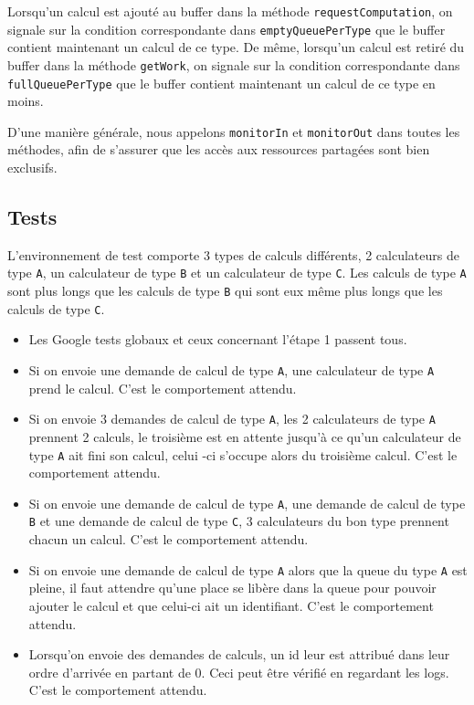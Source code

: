 \documentclass{article}
\begin{document}
Lorsqu'un calcul est ajouté au buffer dans la méthode \texttt{requestComputation}, on signale sur la condition correspondante
dans \texttt{emptyQueuePerType} que le buffer contient maintenant un calcul de ce type. De même, lorsqu'un calcul est
retiré du buffer dans la méthode \texttt{getWork}, on signale sur la condition correspondante dans \texttt{fullQueuePerType}
que le buffer contient maintenant un calcul de ce type en moins.

D'une manière générale, nous appelons \texttt{monitorIn} et \texttt{monitorOut} dans toutes les méthodes, afin de
s'assurer que les accès aux ressources partagées sont bien exclusifs.

\subsection{Tests}
L'environnement de test comporte 3 types de calculs différents, 2 calculateurs de type \texttt{A}, un
calculateur de type \texttt{B} et un calculateur de type \texttt{C}. Les calculs de type \texttt{A} sont plus longs
que les calculs de type \texttt{B} qui sont eux même plus longs que les calculs de type \texttt{C}.

\pagebreak

\begin{itemize}
    \item Les Google tests globaux et ceux concernant l'étape 1 passent tous.
    \item Si on envoie une demande de calcul de type \texttt{A}, une calculateur de type \texttt{A} prend le calcul.
    C'est le comportement attendu.
    \item Si on envoie 3 demandes de calcul de type \texttt{A}, les 2 calculateurs de type \texttt{A} prennent 2
    calculs, le troisième est en attente jusqu'à ce qu'un calculateur de type \texttt{A} ait fini son calcul, celui
    -ci s'occupe alors du troisième calcul. C'est le comportement attendu.
    \item Si on envoie une demande de calcul de type \texttt{A}, une demande de calcul de type \texttt{B} et une
    demande de calcul de type \texttt{C}, 3 calculateurs du bon type prennent chacun un calcul. C'est le comportement attendu.
    \item Si on envoie une demande de calcul de type \texttt{A} alors que la queue du type \texttt{A} est pleine, il
    faut attendre qu'une place se libère dans la queue pour pouvoir ajouter le calcul et que celui-ci ait un
    identifiant. C'est le comportement attendu.
    \item Lorsqu'on envoie des demandes de calculs, un id leur est attribué dans leur ordre d'arrivée en partant de
    0. Ceci peut être vérifié en regardant les logs. C'est le comportement attendu.
\end{itemize}
\end{document}
